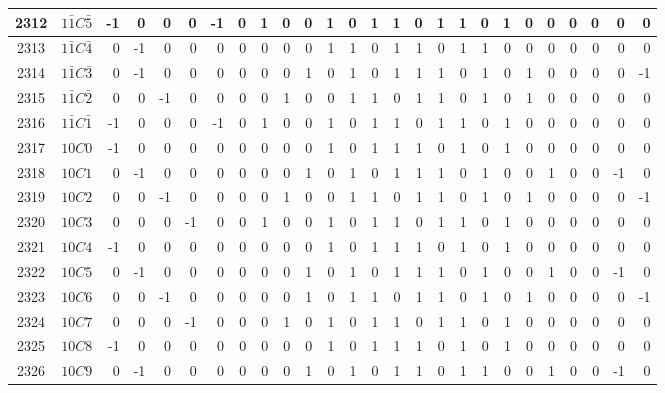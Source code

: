 \documentclass[12 pt]{article}%
\begin{document}
\begin{tiny}
\begin{centering}
\begin{longtable}{|c|c||rrrrrrrrrrrrrrrrrrrrrrrr|}
      \hline
      2312 & $1\bar1C\bar5$ & -1 & 0 & 0 & 0 & -1 & 0 & 1 & 0 & 0 & 1 & 0 & 1 & 1 & 0 & 1 & 1 & 0 & 1 & 0 & 0 & 0 & 0 & 0 & 0 \\
      \hline
      2313 & $1\bar1C\bar4$ & 0 & -1 & 0 & 0 & 0 & 0 & 0 & 0 & 0 & 1 & 1 & 0 & 1 & 1 & 0 & 1 & 1 & 0 & 0 & 0 & 0 & 0 & 0 & 0 \\
      \hline
      2314 & $1\bar1C\bar3$ & 0 & -1 & 0 & 0 & 0 & 0 & 0 & 0 & 1 & 0 & 1 & 0 & 1 & 1 & 1 & 0 & 1 & 0 & 1 & 0 & 0 & 0 & 0 & -1 \\
      \hline
      2315 & $1\bar1C\bar2$ & 0 & 0 & -1 & 0 & 0 & 0 & 0 & 1 & 0 & 0 & 1 & 1 & 0 & 1 & 1 & 0 & 1 & 0 & 1 & 0 & 0 & 0 & 0 & 0 \\
      \hline
      2316 & $1\bar1C\bar1$ & -1 & 0 & 0 & 0 & -1 & 0 & 1 & 0 & 0 & 1 & 0 & 1 & 1 & 0 & 1 & 1 & 0 & 1 & 0 & 0 & 0 & 0 & 0 & 0 \\
      \hline
      2317 & $10C0$ & -1 & 0 & 0 & 0 & 0 & 0 & 0 & 0 & 0 & 1 & 0 & 1 & 1 & 1 & 0 & 1 & 0 & 1 & 0 & 0 & 0 & 0 & 0 & 0 \\
      \hline
      2318 & $10C1$ & 0 & -1 & 0 & 0 & 0 & 0 & 0 & 0 & 1 & 0 & 1 & 0 & 1 & 1 & 1 & 0 & 1 & 0 & 0 & 1 & 0 & 0 & -1 & 0 \\
      \hline
      2319 & $10C2$ & 0 & 0 & -1 & 0 & 0 & 0 & 0 & 1 & 0 & 0 & 1 & 1 & 0 & 1 & 1 & 0 & 1 & 0 & 1 & 0 & 0 & 0 & 0 & -1 \\
      \hline
      2320 & $10C3$ & 0 & 0 & 0 & -1 & 0 & 0 & 1 & 0 & 0 & 1 & 0 & 1 & 1 & 0 & 1 & 1 & 0 & 1 & 0 & 0 & 0 & 0 & 0 & 0 \\
      \hline
      2321 & $10C4$ & -1 & 0 & 0 & 0 & 0 & 0 & 0 & 0 & 0 & 1 & 0 & 1 & 1 & 1 & 0 & 1 & 0 & 1 & 0 & 0 & 0 & 0 & 0 & 0 \\
      \hline
      2322 & $10C5$ & 0 & -1 & 0 & 0 & 0 & 0 & 0 & 0 & 1 & 0 & 1 & 0 & 1 & 1 & 1 & 0 & 1 & 0 & 0 & 1 & 0 & 0 & -1 & 0 \\
      \hline
      2323 & $10C6$ & 0 & 0 & -1 & 0 & 0 & 0 & 0 & 0 & 1 & 0 & 1 & 1 & 0 & 1 & 1 & 0 & 1 & 0 & 1 & 0 & 0 & 0 & 0 & -1 \\
      \hline
      2324 & $10C7$ & 0 & 0 & 0 & -1 & 0 & 0 & 0 & 1 & 0 & 1 & 0 & 1 & 1 & 0 & 1 & 1 & 0 & 1 & 0 & 0 & 0 & 0 & 0 & 0 \\
      \hline
      2325 & $10C8$ & -1 & 0 & 0 & 0 & 0 & 0 & 0 & 0 & 0 & 1 & 0 & 1 & 1 & 1 & 0 & 1 & 0 & 1 & 0 & 0 & 0 & 0 & 0 & 0 \\
      \hline
      2326 & $10C9$ & 0 & -1 & 0 & 0 & 0 & 0 & 0 & 0 & 1 & 0 & 1 & 0 & 1 & 1 & 0 & 1 & 1 & 0 & 0 & 1 & 0 & 0 & -1 & 0 \\

\end{longtable}
\end{centering}
\end{tiny}
\end{document}

